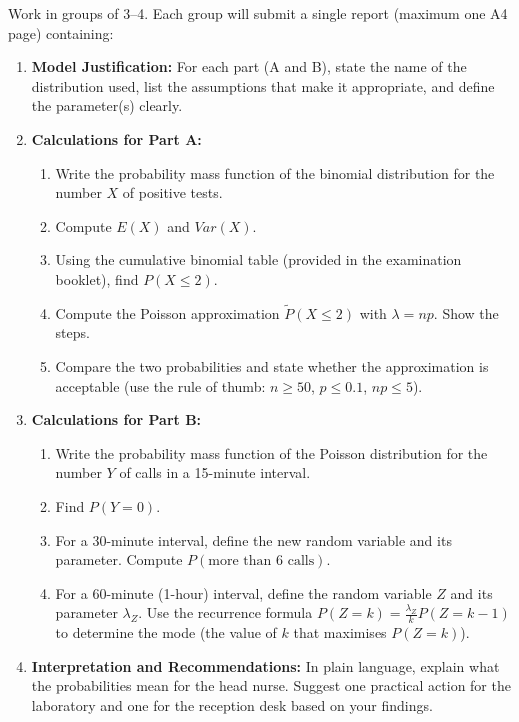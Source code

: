\documentclass[11pt]{article}
\begin{document}
\begin{experience}
Work in groups of 3--4. Each group will submit a single report (maximum one A4 page) containing:
\begin{enumerate}
\item \textbf{Model Justification:} For each part (A and B), state the name of the distribution used, list the assumptions that make it appropriate, and define the parameter(s) clearly.
\item \textbf{Calculations for Part A:}
      \begin{enumerate}
      \item Write the probability mass function of the binomial distribution for the number $X$ of positive tests.
      \item Compute $E(X)$ and $Var(X)$.
      \item Using the cumulative binomial table (provided in the examination booklet), find $P(X \le 2)$.
      \item Compute the Poisson approximation $\tilde{P}(X \le 2)$ with $\lambda = np$. Show the steps.
      \item Compare the two probabilities and state whether the approximation is acceptable (use the rule of thumb: $n \ge 50$, $p \le 0.1$, $np \le 5$).
      \end{enumerate}
\item \textbf{Calculations for Part B:}
      \begin{enumerate}
      \item Write the probability mass function of the Poisson distribution for the number $Y$ of calls in a 15-minute interval.
      \item Find $P(Y = 0)$.
      \item For a 30-minute interval, define the new random variable and its parameter. Compute $P(\text{more than 6 calls})$.
      \item For a 60-minute (1-hour) interval, define the random variable $Z$ and its parameter $\lambda_Z$. Use the recurrence formula $P(Z=k) = \frac{\lambda_Z}{k} P(Z=k-1)$ to determine the mode (the value of $k$ that maximises $P(Z=k)$).
      \end{enumerate}
\item \textbf{Interpretation and Recommendations:} In plain language, explain what the probabilities mean for the head nurse. Suggest one practical action for the laboratory and one for the reception desk based on your findings.
\end{enumerate}
\end{experience}
\end{document}
